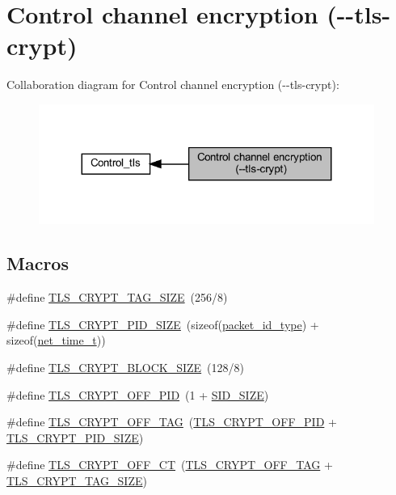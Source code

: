 \hypertarget{group__tls__crypt}{}\section{Control channel encryption (-\/-\/tls-\/crypt)}
\label{group__tls__crypt}
Collaboration diagram for Control channel encryption (-\/-\/tls-\/crypt)\+:
\nopagebreak
\begin{figure}[H]
\begin{center}
\leavevmode
\includegraphics[width=311pt]{group__tls__crypt}
\end{center}
\end{figure}
\subsection*{Macros}
\begin{DoxyCompactItemize}
\item 
\#define \hyperlink{group__tls__crypt_ga65e056054468311502b28a13b7b1a3ef}{T\+L\+S\+\_\+\+C\+R\+Y\+P\+T\+\_\+\+T\+A\+G\+\_\+\+S\+I\+Z\+E}~(256/8)
\item 
\#define \hyperlink{group__tls__crypt_ga55c58e2fa69ea5ffbbb71e25520618e0}{T\+L\+S\+\_\+\+C\+R\+Y\+P\+T\+\_\+\+P\+I\+D\+\_\+\+S\+I\+Z\+E}~(sizeof(\hyperlink{packet__id_8h_a345f753b1c6ea20d24409e769aadb7e6}{packet\+\_\+id\+\_\+type}) + sizeof(\hyperlink{packet__id_8h_a32b361b1d3a0fc2f92ceeff736bba97e}{net\+\_\+time\+\_\+t}))
\item 
\#define \hyperlink{group__tls__crypt_ga1acab4b545b3fff369cb0c05b1897c02}{T\+L\+S\+\_\+\+C\+R\+Y\+P\+T\+\_\+\+B\+L\+O\+C\+K\+\_\+\+S\+I\+Z\+E}~(128/8)
\item 
\#define \hyperlink{group__tls__crypt_ga7eb6b7a1658d8cf6f2f2119b5b927d29}{T\+L\+S\+\_\+\+C\+R\+Y\+P\+T\+\_\+\+O\+F\+F\+\_\+\+P\+I\+D}~(1 + \hyperlink{session__id_8h_ad1163f0bf6339f1dd003192df69052df}{S\+I\+D\+\_\+\+S\+I\+Z\+E})
\item 
\#define \hyperlink{group__tls__crypt_ga8fb65027448e8c403fbbce9bc3b0e056}{T\+L\+S\+\_\+\+C\+R\+Y\+P\+T\+\_\+\+O\+F\+F\+\_\+\+T\+A\+G}~(\hyperlink{group__tls__crypt_ga7eb6b7a1658d8cf6f2f2119b5b927d29}{T\+L\+S\+\_\+\+C\+R\+Y\+P\+T\+\_\+\+O\+F\+F\+\_\+\+P\+I\+D} + \hyperlink{group__tls__crypt_ga55c58e2fa69ea5ffbbb71e25520618e0}{T\+L\+S\+\_\+\+C\+R\+Y\+P\+T\+\_\+\+P\+I\+D\+\_\+\+S\+I\+Z\+E})
\item 
\#define \hyperlink{group__tls__crypt_gaae4cc51d2d63382d195391a4c50af92b}{T\+L\+S\+\_\+\+C\+R\+Y\+P\+T\+\_\+\+O\+F\+F\+\_\+\+C\+T}~(\hyperlink{group__tls__crypt_ga8fb65027448e8c403fbbce9bc3b0e056}{T\+L\+S\+\_\+\+C\+R\+Y\+P\+T\+\_\+\+O\+F\+F\+\_\+\+T\+A\+G} + \hyperlink{group__tls__crypt_ga65e056054468311502b28a13b7b1a3ef}{T\+L\+S\+\_\+\+C\+R\+Y\+P\+T\+\_\+\+T\+A\+G\+\_\+\+S\+I\+Z\+E})
\end{DoxyCompactItemize}
